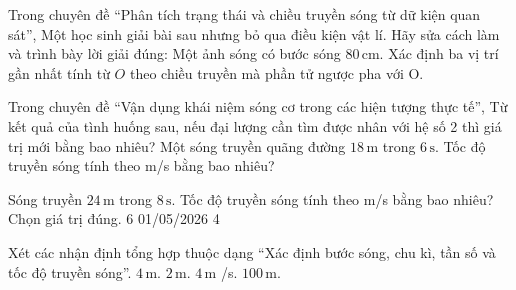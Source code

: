 \begin{ex}
Trong chuyên đề “Phân tích trạng thái và chiều truyền sóng từ dữ kiện quan sát”, Một học sinh giải bài sau nhưng bỏ qua điều kiện vật lí. Hãy sửa cách làm và trình bày lời giải đúng: Một ảnh sóng có bước sóng $80\,\text{cm}$. Xác định ba vị trí gần nhất tính từ $O$ theo chiều truyền mà phần tử ngược pha với O.
\choiceTF

\end{ex}

\begin{ex}
Trong chuyên đề “Vận dụng khái niệm sóng cơ trong các hiện tượng thực tế”, Từ kết quả của tình huống sau, nếu đại lượng cần tìm được nhân với hệ số 2 thì giá trị mới bằng bao nhiêu? Một sóng truyền quãng đường $18\,\text{m}$ trong $6\,\text{s}$. Tốc độ truyền sóng tính theo m/s bằng bao nhiêu?
\end{ex}

\begin{ex}
Sóng truyền $24\,\text{m}$ trong $8\,\text{s}$. Tốc độ truyền sóng tính theo m/s bằng bao nhiêu? Chọn giá trị đúng.
\choice
{}
{6}
{01/05/2026}
{4}
\end{ex}

\begin{ex}
Xét các nhận định tổng hợp thuộc dạng “Xác định bước sóng, chu kì, tần số và tốc độ truyền sóng”.
\choiceTF
{\True $4\,\text{m}$.}
{\True $2\,\text{m}$.}
{\True $4\,\text{m}$ /s.}
{$100\,\text{m}$.}
\end{ex}


